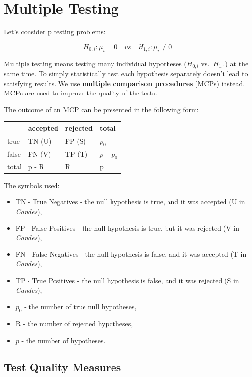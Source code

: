 \documentclass[
]{article}
\begin{document}
\hypertarget{multiple-testing}{%
\section{Multiple Testing}\label{multiple-testing}}

Let's consider p testing problems:

\[H_{0, i}: \mu_i = 0 \quad vs \quad H_{1, i}: \mu_i \neq 0\]

Multiple testing means testing many individual hypotheses (\(H_{0, i}\)
vs.~\(H_{1, i}\)) at the same time. To simply statistically test each
hypothesis separately doesn't lead to satisfying results. We use
\textbf{multiple comparison procedures} (MCPs) instead. MCPs are used to
improve the quality of the tests.

The outcome of an MCP can be presented in the following form:

\begin{longtable}[]{@{}llll@{}}
\toprule
& accepted & rejected & total\tabularnewline
\midrule
\endhead
true & TN (U) & FP (S) & \(p_0\)\tabularnewline
false & FN (V) & TP (T) & \(p - p_0\)\tabularnewline
total & p - R & R & p\tabularnewline
\bottomrule
\end{longtable}

The symbols used:

\begin{itemize}
\item
  TN - True Negatives - the null hypothesis is true, and it was accepted
  (U in \emph{Candes}),
\item
  FP - False Positives - the null hypothesis is true, but it was
  rejected (V in \emph{Candes}),
\item
  FN - False Negatives - the null hypothesis is false, and it was
  accepted (T in \emph{Candes}),
\item
  TP - True Positives - the null hypothesis is false, and it was
  rejected (S in \emph{Candes}),
\item
  \(p_0\) - the number of true null hypotheses,
\item
  R - the number of rejected hypotheses,
\item
  \(p\) - the number of hypotheses.
\end{itemize}

\hypertarget{test-quality-measures}{%
\subsection{Test Quality Measures}\label{test-quality-measures}}
\end{document}
